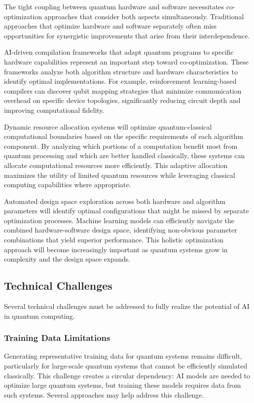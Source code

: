 The tight coupling between quantum hardware and software necessitates co-optimization approaches that consider both aspects simultaneously. Traditional approaches that optimize hardware and software separately often miss opportunities for synergistic improvements that arise from their interdependence.

AI-driven compilation frameworks that adapt quantum programs to specific hardware capabilities represent an important step toward co-optimization. These frameworks analyze both algorithm structure and hardware characteristics to identify optimal implementations. For example, reinforcement learning-based compilers can discover qubit mapping strategies that minimize communication overhead on specific device topologies, significantly reducing circuit depth and improving computational fidelity.

Dynamic resource allocation systems will optimize quantum-classical computational boundaries based on the specific requirements of each algorithm component. By analyzing which portions of a computation benefit most from quantum processing and which are better handled classically, these systems can allocate computational resources more efficiently. This adaptive allocation maximizes the utility of limited quantum resources while leveraging classical computing capabilities where appropriate.

Automated design space exploration across both hardware and algorithm parameters will identify optimal configurations that might be missed by separate optimization processes. Machine learning models can efficiently navigate the combined hardware-software design space, identifying non-obvious parameter combinations that yield superior performance. This holistic optimization approach will become increasingly important as quantum systems grow in complexity and the design space expands.

\subsection{Technical Challenges}

Several technical challenges must be addressed to fully realize the potential of AI in quantum computing.

\subsubsection{Training Data Limitations}

Generating representative training data for quantum systems remains difficult, particularly for large-scale quantum systems that cannot be efficiently simulated classically. This challenge creates a circular dependency: AI models are needed to optimize large quantum systems, but training these models requires data from such systems. Several approaches may help address this challenge.

